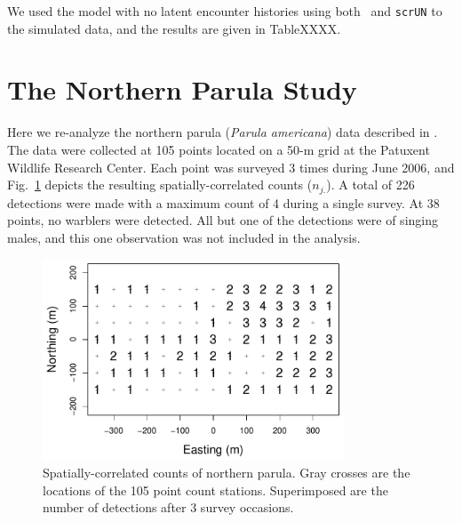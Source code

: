 We used the model with no latent encounter histories using both
\jags~and \verb+scrUN+ to the simulated data, and the results
are given in TableXXXX.








\section{The Northern Parula Study}

Here we re-analyze the northern parula ({\it Parula americana}) data
described in \citet{chandler_royle:2012}. The data were collected at
105 points located on a 50-m grid at the Patuxent Wildlife Research
Center. Each point was surveyed 3 times during June 2006, and
Fig.~\ref{fig:nopaDat} depicts the resulting spatially-correlated
counts ($n_{j.}$). A total of 226 detections were made with a maximum
count of 4 during a single survey. At 38 points, no warblers were
detected. All but one of the detections were of singing males, and
this one observation was not included in the analysis.

\begin{figure}
  \centering
  \includegraphics[width=0.8\textwidth]{Ch18-Unmarked/figs/nopaCounts}
  \caption{Spatially-correlated counts of northern parula. Gray
    crosses are the locations of the 105 point count
    stations. Superimposed are the number of detections after 3 survey occasions.}
  \label{fig:nopaDat}
\end{figure}


